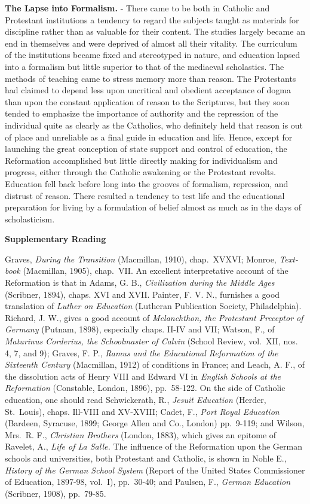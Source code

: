 \documentclass[
]{book}
\begin{document}
\textbf{The Lapse into Formalism.} - There came to be both in Catholic and Protestant institutions a tendency to regard the subjects taught as materials for discipline rather than as valuable for their content. The studies largely became an end in themselves and were deprived of almost all their vitality. The curriculum of the institutions became fixed and stereotyped in nature, and education lapsed into a formalism but little superior to that of the mediaeval scholastics. The methods of teaching came to stress memory more than reason. The Protestants had claimed to depend less upon uncritical and obedient acceptance of dogma than upon the constant application of reason to the Scriptures, but they soon tended to emphasize the importance of authority and the repression of the individual quite as clearly as the Catholics, who definitely held that reason is out of place and unreliable as a final guide in education and life. Hence, except for launching the great conception of state support and control of education, the Reformation accomplished but little directly making for individualism and progress, either through the Catholic awakening or the Protestant revolts. Education fell back before long into the grooves of formalism, repression, and distrust of reason. There resulted a tendency to test life and the educational preparation for living by a formulation of belief almost as much as in the days of scholasticism.

\textbf{Supplementary Reading}

Graves, \emph{During the Transition} (Macmillan, 1910), chap.~XVXVI; Monroe, \emph{Text-book} (Macmillan, 1905), chap.~VII. An excellent interpretative account of the Reformation is that in Adams, G. B., \emph{Civilization during the Middle Ages} (Scribner, 1894), chaps. XVI and XVII. Painter, F. V. N., furnishes a good translation of \emph{Luther on Education} (Lutheran Publication Society, Philadelphia). Richard, J. W., gives a good account of \emph{Melanchthon, the Protestant Preceptor of Germany} (Putnam, 1898), especially chaps. II-IV and VII; Watson, F., of \emph{Maturinus Corderius, the Schoolmaster of Calvin} (School Review, vol.~XII, nos. 4, 7, and 9); Graves, F. P., \emph{Ramus and the Educational Reformation of the Sixteenth Century} (Macmillan, 1912) of conditions in France; and Leach, A. F., of the dissolution acts of Henry VIII and Edward VI in \emph{English Schools at the Reformation} (Constable, London, 1896), pp.~58-122. On the side of Catholic education, one should read Schwickerath, R., \emph{Jesuit Education} (Herder, St.~Louis), chaps. Ill-VIII and XV-XVIII; Cadet, F., \emph{Port Royal Education} (Bardeen, Syracuse, 1899; George Allen and Co., London) pp.~9-119; and Wilson, Mrs.~R. F., \emph{Christian Brothers} (London, 1883), which gives an epitome of Ravelet, A., \emph{Life of La Salle.} The influence of the Reformation upon the German schools and universities, both Protestant and Catholic, is shown in Nohle E., \emph{History of the German School System} (Report of the United States Commissioner of Education, 1897-98, vol.~I), pp.~30-40; and Paulsen, F., \emph{German Education} (Scribner, 1908), pp.~79-85.
\end{document}
